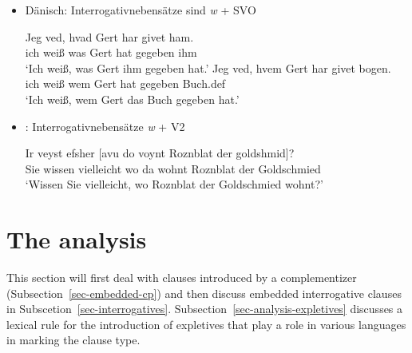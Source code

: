 \begin{itemize}
\item Dänisch: Interrogativnebensätze sind \emph{w} + SVO

\eal
\ex
\gll Jeg ved, hvad Gert har givet ham.\\
     ich weiß was Gert  hat gegeben ihm\\
\glt `Ich weiß, was Gert ihm gegeben hat.'
\ex
\gll Jeg ved, hvem Gert har givet   bogen.\\
     ich weiß wem  Gert hat gegeben Buch.{\sc def}\\
\glt `Ich weiß, wem Gert das Buch gegeben hat.'
\zl

\end{itemize}


\begin{itemize}
\item {}: Interrogativnebensätze \emph{w} + V2 \citep[Abschnitte~4.1, 4.2]{Diesing90a}




\ea
\gll Ir veyst efsher [avu            do    voynt Roznblat   der goldshmid]?\footnotemark\\
     Sie wissen vielleicht  \spacebr{}wo da wohnt Roznblat der Goldschmied\\
\glt `Wissen Sie vielleicht, wo Roznblat der Goldschmied wohnt?' 
\z
\end{itemize}

\fi

\section{The analysis}

This section will first deal with clauses introduced by a complementizer
(Subsection~\ref{sec-embedded-cp}) and then discuss embedded interrogative clauses in
Subscetion~\ref{sec-interrogatives}. Subsection~\ref{sec-analysis-expletives} discusses a lexical rule for
the introduction of expletives that play a role in various languages in marking the clause type.

